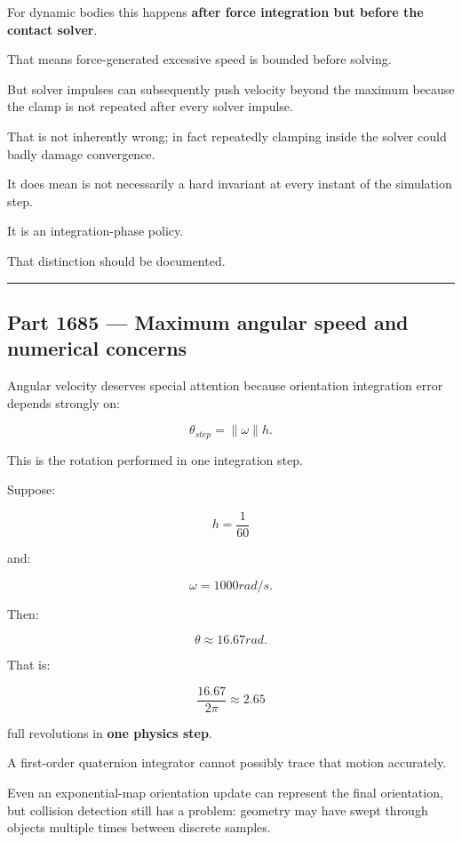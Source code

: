 For dynamic bodies this happens \textbf{after force integration but before the contact solver}.

That means force-generated excessive speed is bounded before solving.

But solver impulses can subsequently push velocity beyond the maximum because the clamp is not repeated after every solver impulse.

That is not inherently wrong; in fact repeatedly clamping inside the solver could badly damage convergence.

It does mean  is not necessarily a hard invariant at every instant of the simulation step.

It is an integration-phase policy.

That distinction should be documented.

\begin{center}\rule{0.5\linewidth}{0.5pt}\end{center}

\subsection{Part 1685 --- Maximum angular speed and numerical concerns}\label{06-engine-ii-ch038-part-1685-maximum-angular-speed-and-numerical-concerns}

\hypertarget{06-engine-ii-ch038-part-1685-maximum-angular-speed-and-numerical-concerns}{}

Angular velocity deserves special attention because orientation integration error depends strongly on:

\[
\boxed{
\theta_{step}
=
\|\omega\|h.
}
\]

This is the rotation performed in one integration step.

Suppose:

\[
h=\frac1{60}
\]

and:

\[
\omega=1000rad/s.
\]

Then:

\[
\theta
\approx16.67rad.
\]

That is:

\[
\frac{16.67}{2\pi}
\approx2.65
\]

full revolutions in \textbf{one physics step}.

A first-order quaternion integrator cannot possibly trace that motion accurately.

Even an exponential-map orientation update can represent the final orientation, but collision detection still has a problem: geometry may have swept through objects multiple times between discrete samples.

